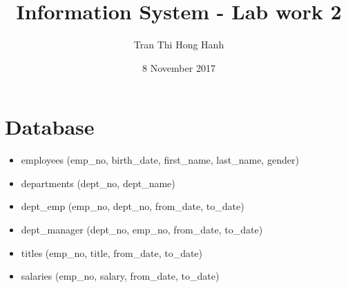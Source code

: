 \documentclass{article}
\title{Information System - Lab work 2}
\author{Tran Thi Hong Hanh}
\date{8 November 2017}
\begin{document}
\maketitle
\section*{Database}
\begin{itemize}
	\item employees (emp\_no, birth\_date, first\_name, last\_name, gender)
	\item departments (dept\_no, dept\_name)
	\item dept\_emp (emp\_no, dept\_no, from\_date, to\_date)
	\item dept\_manager (dept\_no, emp\_no, from\_date, to\_date)
	\item titles (emp\_no, title, from\_date, to\_date)
	\item salaries (emp\_no, salary, from\_date, to\_date)
\end{itemize}
\end{document}
